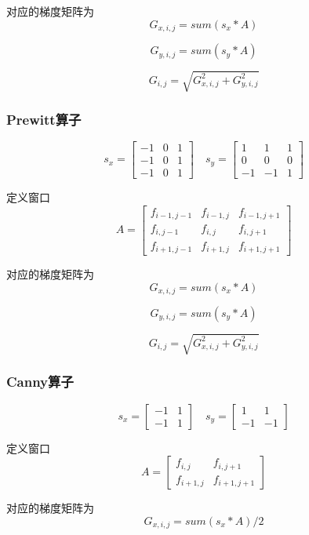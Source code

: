 \documentclass{article}
\begin{document}
对应的梯度矩阵为
\[
G_{x, i,j} = sum\left( s_x * A \right)
\]

\[G_{y, i,j} = sum\left( s_y * A \right)
\]

\[G_{i,j} = \sqrt{G_{x, i,j}^2 + G_{y, i,j}^2}\]

\subsubsection{Prewitt算子}

\[
s_x =
\begin{bmatrix}-1 & 0 & 1\\ -1 & 0 & 1 \\ -1 & 0 & 1
\end{bmatrix}
\quad
s_y =
\begin{bmatrix}1 & 1 & 1 \\ 0 & 0 & 0 \\ -1 & -1 & 1
\end{bmatrix}
\]

定义窗口
\[A = \begin{bmatrix}f_{i - 1, j - 1} & f_{i - 1, j} & f_{i - 1, j + 1} \\f_{i, j - 1} & f_{i,j} & f_{i, j + 1} \\ f_{i + 1, j - 1} & f_{i + 1, j} & f_{i + 1, j + 1}
\end{bmatrix}\]

对应的梯度矩阵为
\[
G_{x, i,j} = sum\left( s_x * A \right)
\]

\[G_{y, i,j} = sum\left( s_y * A \right)
\]

\[G_{i,j} = \sqrt{G_{x, i,j}^2 + G_{y, i,j}^2}\]

\subsubsection{Canny算子}

\[
s_x =
\begin{bmatrix}-1 & 1 \\ -1 & 1
\end{bmatrix}
\quad
s_y =
\begin{bmatrix}1 & 1 \\ -1 & -1
\end{bmatrix}
\]

定义窗口\[A = \begin{bmatrix}f_{i,j} & f_{i, j + 1} \\ f_{i + 1, j} & f_{i + 1, j + 1}
\end{bmatrix}\]

对应的梯度矩阵为
\[
G_{x, i,j} = sum\left( s_x * A \right) / 2
\]
\end{document}
